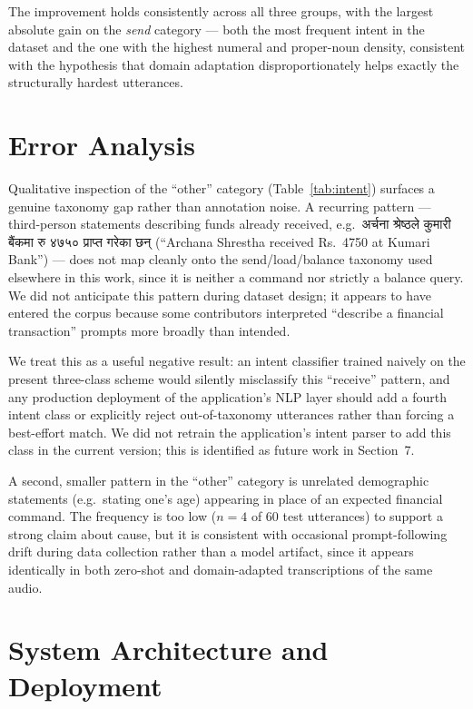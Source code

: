 \documentclass[11pt,a4paper]{article}
\newcommand{\dev}[1]{{\devfont #1}}
\newcommand{\dev}[1]{{\devfont #1}}
\newcommand{\dev}[1]{#1}
\begin{document}
The improvement holds consistently across all three groups, with the
largest absolute gain on the \textit{send} category --- both the most
frequent intent in the dataset and the one with the highest numeral and
proper-noun density, consistent with the hypothesis that domain adaptation
disproportionately helps exactly the structurally hardest utterances.

\section{Error Analysis}

Qualitative inspection of the ``other'' category (Table~\ref{tab:intent})
surfaces a genuine taxonomy gap rather than annotation noise. A recurring
pattern --- third-person statements describing funds already received,
e.g.\ \dev{अर्चना श्रेष्ठले कुमारी बैंकमा रु ४७५० प्राप्त गरेका छन्} (``Archana
Shrestha received Rs.\ 4750 at Kumari Bank'') --- does not map cleanly onto
the send/load/balance taxonomy used elsewhere in this work, since it is
neither a command nor strictly a balance query. We did not anticipate this
pattern during dataset design; it appears to have entered the corpus
because some contributors interpreted ``describe a financial transaction''
prompts more broadly than intended.

We treat this as a useful negative result: an intent classifier trained
naively on the present three-class scheme would silently misclassify this
``receive'' pattern, and any production deployment of the application's
NLP layer should add a fourth intent class or explicitly reject
out-of-taxonomy utterances rather than forcing a best-effort match. We did
not retrain the application's intent parser to add this class in the
current version; this is identified as future work in Section~7.

A second, smaller pattern in the ``other'' category is unrelated
demographic statements (e.g.\ stating one's age) appearing in place of an
expected financial command. The frequency is too low ($n=4$ of 60 test
utterances) to support a strong claim about cause, but it is consistent
with occasional prompt-following drift during data collection rather than
a model artifact, since it appears identically in both zero-shot and
domain-adapted transcriptions of the same audio.

\section{System Architecture and Deployment}
\end{document}
